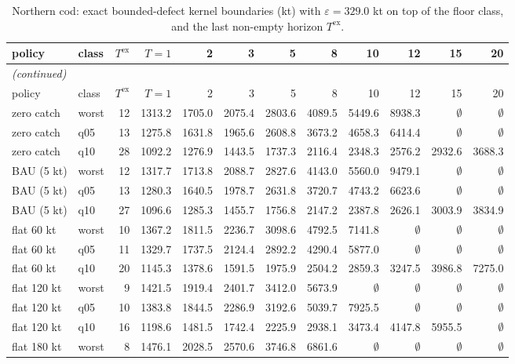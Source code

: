 \documentclass[11pt,a4paper]{article}
\begin{document}
\begin{longtable}{llrrrrrrrrrr}
\caption{Northern cod: exact bounded-defect kernel boundaries (kt) with $\varepsilon=329.0$ kt on top of the floor class, and the last non-empty horizon $T^{\mathrm{ex}}$.}\label{tab:si-cod-exact}\\
\toprule
policy & class & $T^{\mathrm{ex}}$ & $T{=}1$ & 2 & 3 & 5 & 8 & 10 & 12 & 15 & 20 \\
\midrule
\endfirsthead
\multicolumn{12}{l}{\emph{(continued)}}\\
\toprule
policy & class & $T^{\mathrm{ex}}$ & $T{=}1$ & 2 & 3 & 5 & 8 & 10 & 12 & 15 & 20 \\
\midrule
\endhead
\bottomrule
\endfoot
zero catch & worst & 12 & 1313.2 & 1705.0 & 2075.4 & 2803.6 & 4089.5 & 5449.6 & 8938.3 & $\emptyset$ & $\emptyset$ \\
zero catch & q05 & 13 & 1275.8 & 1631.8 & 1965.6 & 2608.8 & 3673.2 & 4658.3 & 6414.4 & $\emptyset$ & $\emptyset$ \\
zero catch & q10 & 28 & 1092.2 & 1276.9 & 1443.5 & 1737.3 & 2116.4 & 2348.3 & 2576.2 & 2932.6 & 3688.3 \\
BAU (5 kt) & worst & 12 & 1317.7 & 1713.8 & 2088.7 & 2827.6 & 4143.0 & 5560.0 & 9479.1 & $\emptyset$ & $\emptyset$ \\
BAU (5 kt) & q05 & 13 & 1280.3 & 1640.5 & 1978.7 & 2631.8 & 3720.7 & 4743.2 & 6623.6 & $\emptyset$ & $\emptyset$ \\
BAU (5 kt) & q10 & 27 & 1096.6 & 1285.3 & 1455.7 & 1756.8 & 2147.2 & 2387.8 & 2626.1 & 3003.9 & 3834.9 \\
flat 60 kt & worst & 10 & 1367.2 & 1811.5 & 2236.7 & 3098.6 & 4792.5 & 7141.8 & $\emptyset$ & $\emptyset$ & $\emptyset$ \\
flat 60 kt & q05 & 11 & 1329.7 & 1737.5 & 2124.4 & 2892.2 & 4290.4 & 5877.0 & $\emptyset$ & $\emptyset$ & $\emptyset$ \\
flat 60 kt & q10 & 20 & 1145.3 & 1378.6 & 1591.5 & 1975.9 & 2504.2 & 2859.3 & 3247.5 & 3986.8 & 7275.0 \\
flat 120 kt & worst & 9 & 1421.5 & 1919.4 & 2401.7 & 3412.0 & 5673.9 & $\emptyset$ & $\emptyset$ & $\emptyset$ & $\emptyset$ \\
flat 120 kt & q05 & 10 & 1383.8 & 1844.5 & 2286.9 & 3192.6 & 5039.7 & 7925.5 & $\emptyset$ & $\emptyset$ & $\emptyset$ \\
flat 120 kt & q10 & 16 & 1198.6 & 1481.5 & 1742.4 & 2225.9 & 2938.1 & 3473.4 & 4147.8 & 5955.5 & $\emptyset$ \\
flat 180 kt & worst & 8 & 1476.1 & 2028.5 & 2570.6 & 3746.8 & 6861.6 & $\emptyset$ & $\emptyset$ & $\emptyset$ & $\emptyset$ \\

\end{longtable}
\end{document}
